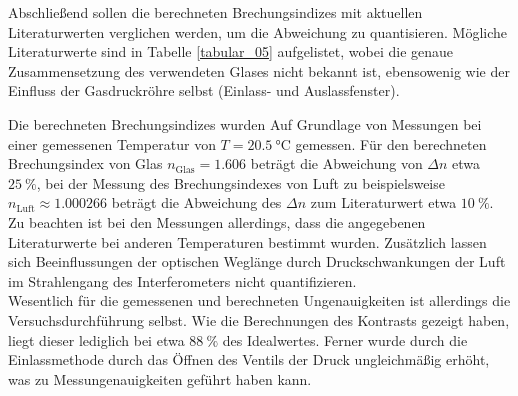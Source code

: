Abschließend sollen die berechneten Brechungsindizes mit aktuellen
Literaturwerten verglichen werden, um die Abweichung zu quantisieren. Mögliche
Literaturwerte sind in Tabelle \ref{tabular_05} aufgelistet, wobei die genaue
Zusammensetzung des verwendeten Glases nicht bekannt ist, ebensowenig wie der
Einfluss der Gasdruckröhre selbst (Einlass- und Auslassfenster). \\
\FloatBarrier

\FloatBarrier
\noindent Die berechneten Brechungsindizes wurden Auf Grundlage von Messungen bei
einer gemessenen Temperatur von $T = \SI{20.5}{\celsius}$ gemessen. Für den
berechneten Brechungsindex von Glas $n_\text{Glas} = \num{1.606}$ beträgt
die Abweichung von $\Delta n$ etwa $\SI{25}{\percent}$, bei der Messung des Brechungsindexes
von Luft zu beispielsweise $n_\text{Luft} \approx \num{1.000266}$ beträgt die
Abweichung des $\Delta n$ zum Literaturwert etwa $\SI{10}{\percent}$. Zu beachten ist bei den
Messungen allerdings, dass die angegebenen Literaturwerte bei anderen
Temperaturen bestimmt wurden. Zusätzlich lassen sich Beeinflussungen der
optischen Weglänge durch Druckschwankungen der Luft im Strahlengang des
Interferometers nicht quantifizieren. \\
\noindent Wesentlich für die gemessenen und berechneten Ungenauigkeiten ist
allerdings die Versuchsdurchführung selbst. Wie die Berechnungen des Kontrasts
gezeigt haben, liegt dieser lediglich bei etwa $\SI{88}{\percent}$ des
Idealwertes. Ferner wurde durch die Einlassmethode durch das Öffnen des Ventils
der Druck ungleichmäßig erhöht, was zu Messungenauigkeiten geführt haben kann.
